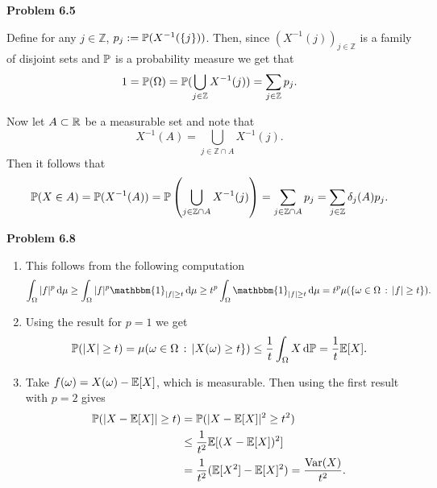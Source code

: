 \documentclass{lecturenotes}
\begin{document}
\textbf{Problem 6.5}

Define for any $j \in \mathbb{Z}$, $p_j := \mathbb P(X^{-1}(\{j\}))$. Then, since $(X^{-1}(j))_{j \in \mathbb{Z}}$ is a family of disjoint sets and $\mathbb P$ is a probability measure we get that
\[
	1 = \mathbb P(\Omega) = \mathbb P(\bigcup_{j \in \mathbb{Z}} X^{-1}(j)) = \sum_{j \in \mathbb{Z}} p_j.
\]

Now let $A \subset \mathbb R$ be a measurable set and note that 
\[
	X^{-1}(A) = \bigcup_{j \in \mathbb{Z} \cap A} X^{-1}(j).
\]
Then it follows that
\[
	\mathbb P(X \in A) = \mathbb P(X^{-1}(A)) = \mathbb P\left(\bigcup_{j \in \mathbb{Z} \cap A} X^{-1}(j)\right)
	= \sum_{j \in \mathbb{Z} \cap A} p_j = \sum_{j \in \mathbb{Z}} \delta_j(A) p_j. 
\]


\bigskip

\textbf{Problem 6.8}

\begin{enumerate}[label=(\alph*)]
\item This follows from the following computation
\[
	\int_\Omega |f|^p \, \dd \mu \ge \int_{\Omega} |f|^p \mathbbm{1}_{|f| \ge t} \, \dd \mu
	\ge t^p \int_\Omega \mathbbm{1}_{|f| \ge t} \, \dd \mu
	= t^p \mu(\{\omega \in \Omega \, : \, |f| \ge t\}).
\]
\item Using the result for $p = 1$ we get
\[
	\mathbb P(|X| \ge t) = \mu(\omega \in \Omega \, : \, |X(\omega) \ge t \})
	\le \frac{1}{t} \int_{\Omega} X \, \mathrm{d} \mathbb P = \frac{1}{t} \mathbb E[X].
\]
\item Take $f(\omega) = X(\omega) - \mathbb E[X]$, which is measurable. Then using the first result with $p = 2$ gives
\begin{align*}
	\mathbb P(|X - \mathbb E[X]| \ge t) &= \mathbb P(|X-\mathbb E[X]|^2 \ge t^2) \\
	&\le \frac{1}{t^2} \mathbb E[(X - \mathbb E[X])^2] \\
	&= \frac{1}{t^2} (\mathbb E[X^2] - \mathbb E[X]^2) = \frac{\mathrm{Var}(X)}{t^2}.
\end{align*}
\end{enumerate}
\end{document}
